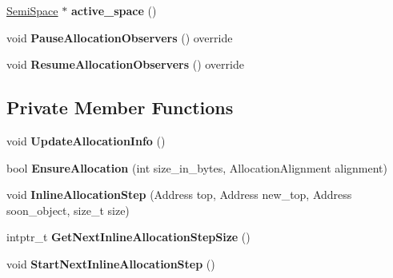 \begin{DoxyCompactItemize}
\item 
\hyperlink{classv8_1_1internal_1_1_semi_space}{Semi\+Space} $\ast$ {\bfseries active\+\_\+space} ()\hypertarget{classv8_1_1internal_1_1_new_space_a2be99e414fb38135104bb1e86cdcb3a4}{}\label{classv8_1_1internal_1_1_new_space_a2be99e414fb38135104bb1e86cdcb3a4}

\item 
void {\bfseries Pause\+Allocation\+Observers} () override\hypertarget{classv8_1_1internal_1_1_new_space_a91b193f47ecdb69b1a24eeb7015f76e4}{}\label{classv8_1_1internal_1_1_new_space_a91b193f47ecdb69b1a24eeb7015f76e4}

\item 
void {\bfseries Resume\+Allocation\+Observers} () override\hypertarget{classv8_1_1internal_1_1_new_space_abdc4d8ec1ab921dd3337554230b3be05}{}\label{classv8_1_1internal_1_1_new_space_abdc4d8ec1ab921dd3337554230b3be05}

\end{DoxyCompactItemize}
\subsection*{Private Member Functions}
\begin{DoxyCompactItemize}
\item 
void {\bfseries Update\+Allocation\+Info} ()\hypertarget{classv8_1_1internal_1_1_new_space_a9e3aa69a4132408cf54bc633119e3237}{}\label{classv8_1_1internal_1_1_new_space_a9e3aa69a4132408cf54bc633119e3237}

\item 
bool {\bfseries Ensure\+Allocation} (int size\+\_\+in\+\_\+bytes, Allocation\+Alignment alignment)\hypertarget{classv8_1_1internal_1_1_new_space_ad9f4918dac208cc96dc60a2c8cd70118}{}\label{classv8_1_1internal_1_1_new_space_ad9f4918dac208cc96dc60a2c8cd70118}

\item 
void {\bfseries Inline\+Allocation\+Step} (Address top, Address new\+\_\+top, Address soon\+\_\+object, size\+\_\+t size)\hypertarget{classv8_1_1internal_1_1_new_space_a28593b2b740ab475f6e640c896542f63}{}\label{classv8_1_1internal_1_1_new_space_a28593b2b740ab475f6e640c896542f63}

\item 
intptr\+\_\+t {\bfseries Get\+Next\+Inline\+Allocation\+Step\+Size} ()\hypertarget{classv8_1_1internal_1_1_new_space_af4b4f7b0a087661251ea05bdb6094eb7}{}\label{classv8_1_1internal_1_1_new_space_af4b4f7b0a087661251ea05bdb6094eb7}

\item 
void {\bfseries Start\+Next\+Inline\+Allocation\+Step} ()\hypertarget{classv8_1_1internal_1_1_new_space_ad1f218581757d28f6ece460504998550}{}\label{classv8_1_1internal_1_1_new_space_ad1f218581757d28f6ece460504998550}

\end{DoxyCompactItemize}

